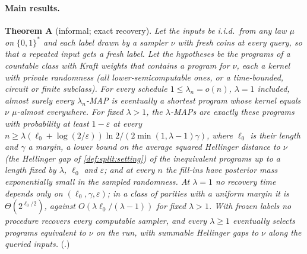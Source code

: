 \paragraph{Main results.} \textbf{Theorem A} (informal; exact recovery). \emph{Let the inputs be i.i.d.\ from any law $\mu$ on $\{0,1\}^*$ and each label drawn by a sampler $\nu$ with fresh coins at every query, so that a repeated input gets a fresh label. Let the hypotheses be the programs of a countable class with Kraft weights that contains a program for $\nu$, each a kernel with private randomness (all lower-semicomputable ones, or a time-bounded, circuit or finite subclass). For every schedule $1\le\lambda_n=o(n)$, $\lambda=1$ included, almost surely every $\lambda_n$-MAP is eventually a shortest program whose kernel equals $\nu$ $\mu$-almost everywhere. For fixed $\lambda>1$, the $\lambda$-MAPs are exactly these programs with probability at least $1-\varepsilon$ at every $n\ge\lambda(\ell_0+\log(2/\varepsilon))\ln2/(2\min(1,\lambda-1)\gamma)$, where $\ell_0$ is their length and $\gamma$ a margin, a lower bound on the average squared Hellinger distance to $\nu$ (the Hellinger gap of \cref{def:split:setting}) of the inequivalent programs up to a length fixed by $\lambda$, $\ell_0$ and $\varepsilon$; and at every $n$ the fill-ins have posterior mass exponentially small in the sampled randomness. At $\lambda=1$ no recovery time depends only on $(\ell_0,\gamma,\varepsilon)$; in a class of parities with a uniform margin it is $\Theta(2^{\ell_0/2})$, against $O(\lambda\ell_0/(\lambda-1))$ for fixed $\lambda>1$. With frozen labels no procedure recovers every computable sampler, and every $\lambda\ge1$ eventually selects programs equivalent to $\nu$ on the run, with summable Hellinger gaps to $\nu$ along the queried inputs.} (.)

